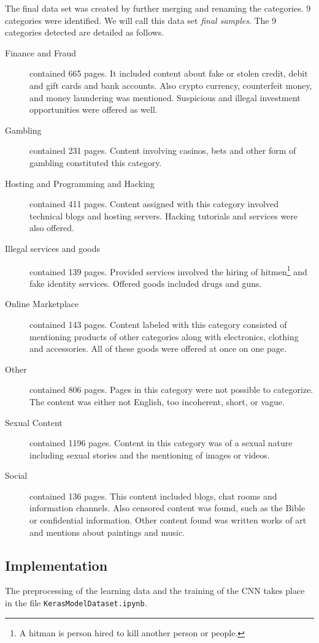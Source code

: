 The final data set was created by further merging and renaming the categories. 9 categories were identified. We will call this data set \textit{final samples}. The 9 categories detected are detailed as follows.
 \label{classificationCategories}
\begin {description}
	\item[Finance and Fraud] contained 665 pages. It included content about fake or stolen credit, debit and gift cards and bank accounts. Also crypto currency, counterfeit money, and money laundering was mentioned. Suspicious and illegal investment opportunities were offered as well.
	\item[Gambling] contained 231 pages. Content involving casinos, bets and other form of gambling constituted this category.
	\item[Hosting and Programming and Hacking] contained 411 pages. Content assigned with this category involved technical blogs and hosting servers. Hacking tutorials and services were also offered.
	\item[Illegal services and goods] contained 139 pages. Provided services involved the hiring of hitmen\footnote{A hitman is person hired to kill another person or people.} and fake identity services. Offered goods included drugs and guns.
	\item[Online Marketplace] contained 143 pages. Content labeled with this category consisted of mentioning products of other categories along with electronics, clothing and accessories. All of these goods were offered at once on one page.
	\item[Other] contained 806 pages. Pages in this category were not possible to categorize. The content was either not English, too incoherent, short, or vague. 
	\item[Sexual Content] contained 1196 pages. Content in this category was of a sexual nature including sexual stories and the mentioning of images or videos.
	\item[Social] contained 136 pages. This content included blogs, chat rooms and information channels. Also censored content was found, such as the Bible or confidential information. Other content found was written works of art and mentions about paintings and music. 
\end{description}

\subsection{Implementation} \label{ClassificationImplementation}
The preprocessing of the learning data and the training of the CNN takes place in the file \texttt{KerasModelDataset.ipynb}. 

